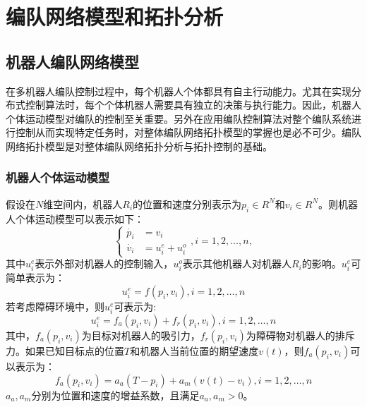 

\chapter{编队网络模型和拓扑分析}
\label{chap:2}

\section{机器人编队网络模型}
在多机器人编队控制过程中，每个机器人个体都具有自主行动能力。尤其在实现分布式控制算法时，每个个体机器人需要具有独立的决策与执行能力。因此，机器人个体运动模型对编队的控制至关重要。另外在应用编队控制算法对整个编队系统进行控制从而实现特定任务时，对整体编队网络拓扑模型的掌握也是必不可少。编队网络拓扑模型是对整体编队网络拓扑分析与拓扑控制的基础\supercite{张飞2010}。

\subsection{机器人个体运动模型}
假设在$N$维空间内，机器人$R_i$的位置和速度分别表示为$p_i \in R^N$和$v_i \in R^N$。则机器人个体运动模型可以表示如下：\\
\begin{equation}
	\left\{
	\begin{aligned}
		\dot{p_i} & = v_i \\
		\dot{v_i} & = u_i^e + u_i^o
	\end{aligned}
	, i=1,2,\dots,n,
	\right.
\end{equation}
其中$u_i^e$表示外部对机器人的控制输入，$u_i^o$表示其他机器人对机器人$R_i$的影响。$u_i^e$可简单表示为：\\
\begin{equation}
	u_i^e = f(p_i,v_i), i=1,2,\dots,n
\end{equation}
若考虑障碍环境中，则$u_i^e$可表示为:\\
\begin{equation}
	u_i^e = f_a(p_i,v_i) + f_r(p_i,v_i), i=1,2,\dots,n
\end{equation}
其中，$f_a(p_i,v_i)$为目标对机器人的吸引力，$f_r(p_i,v_i)$为障碍物对机器人的排斥力。如果已知目标点的位置$T$和机器人当前位置的期望速度$v(t)$，则$f_a(p_i,v_i)$可以表示为：\\
\begin{equation}
	f_a(p_i,v_i) = a_a(T-p_i) + a_m(v(t)-v_i), i=1,2,\dots,n
\end{equation}
$a_a,a_m$分别为位置和速度的增益系数，且满足$a_a,a_m > 0$。

